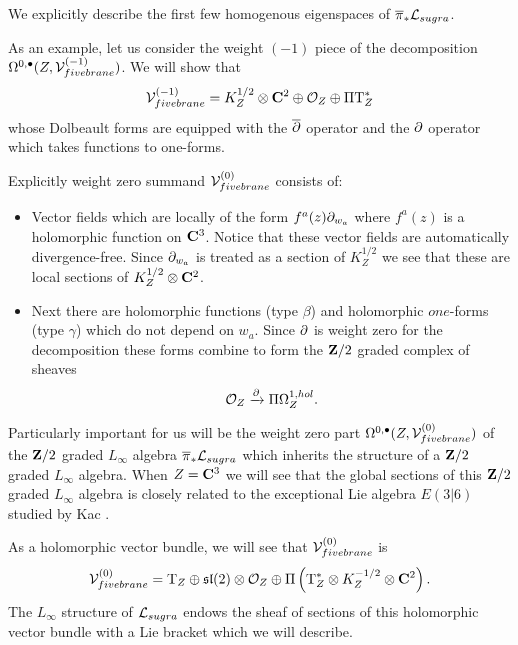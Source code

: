 \documentclass[11pt]{amsart}
\begin{document}
We explicitly describe the first few homogenous eigenspaces of $\overline{\pi}_* \mathcal L_{sugra}$. 

\parsec[s:weight-1]

As an example, let us consider the weight $(-1)$ piece of the decomposition $\Omega^{0,\bullet}(Z, \mathcal V_{fivebrane}^{(-1)})$. 
We will show that 
\[
\mathcal V_{fivebrane}^{(-1)} = K^{1/2}_Z \otimes \mathbf{C}^2 \oplus \mathcal O_Z \oplus \Pi {\rm T}^*_Z 
\]
whose Dolbeault forms are equipped with the $\overline{\partial}$ operator and the $\partial$ operator which takes functions to one-forms. 

Explicitly weight zero summand $\mathcal V_{fivebrane}^{(0)}$ consists of:
\begin{itemize}
\item 
Vector fields which are locally of the form $f^a(z) \partial_{w_a}$ where $f^{a}(z)$ is a holomorphic function on $\mathbf{C}^3$.
Notice that these vector fields are automatically divergence-free.
Since $\partial_{w_a}$ is treated as a section of $K^{1/2}_Z$ we see that these are local sections of $K^{1/2}_Z \otimes \mathbf{C}^2$. 
\item 
Next there are holomorphic functions (type $\beta$) and holomorphic $one$-forms (type $\gamma$) which do not depend on $w_a$. 
Since $\partial$ is weight zero for the decomposition these forms combine to form the $\mathbf{Z}/2$ graded complex of sheaves
\[
\mathcal O_Z \xrightarrow{\partial} \Pi \Omega^{1,hol}_Z .
\]
\end{itemize}

\parsec[s:weight0]

Particularly important for us will be the weight zero part $\Omega^{0,\bullet}(Z, \mathcal V_{fivebrane}^{(0)})$ of the $\mathbf{Z}/2$ graded $L_\infty$ algebra $\overline{\pi}_* \mathcal L_{sugra}$ which inherits the structure of a $\mathbf{Z}/2$ graded $L_\infty$ algebra.
When $Z = \mathbf{C}^3$ we will see that the global sections of this $\mathbf{Z}/2$ graded $L_\infty$ algebra is closely related to the exceptional Lie algebra $E(3|6)$ studied by Kac \cite{KacClass}.

As a holomorphic vector bundle, we will see that $\mathcal V_{fivebrane}^{(0)}$ is 
\[
\mathcal V_{fivebrane}^{(0)} = {\rm T}_Z \oplus \mathfrak{sl}(2) \otimes \mathcal O_Z \oplus \Pi \left( {\rm T}^*_Z \otimes K^{-1/2}_Z \otimes \mathbf{C}^2 \right).
\]
The $L_\infty$ structure of $\mathcal L_{sugra}$ endows the sheaf of sections of this holomorphic vector bundle with a Lie bracket which we will describe.
\end{document}
